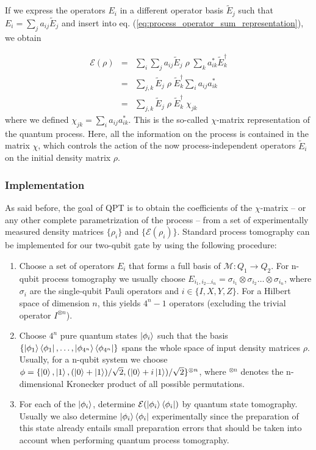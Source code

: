 \smallskip

If we express the operators $E_i$ in a different operator basis $\tilde{E}_j$ such that $E_i = \sum_j a_{ij} \tilde{E}_{j}$ and insert into eq. (\ref{eq:process_operator_sum_representation}), we obtain

\begin{eqnarray}
 \mathcal{E}(\rho) & = & \sum\limits_i \sum\limits_j a_{ij} \tilde{E}_j \;\rho\; \sum\limits_k a_{ik}^* \tilde{E}_k^\dagger \\
& = & \sum\limits_{j,k}\tilde{E}_j \; \rho \; \tilde{E}_k^\dagger \sum\limits_i a_{ij} a_{ik}^* \\
& = & \sum\limits_{j,k}\tilde{E}_j \; \rho \; \tilde{E}_k^\dagger \; \chi_{jk} \label{eq:process_chi_representation}
\end{eqnarray}
where we defined $\chi_{jk} = \sum\limits_i a_{ij} a_{ik}^*$. This is the so-called $\chi$-matrix representation of the quantum process. Here, all the information on the process is contained in the matrix $\chi$, which controls the action of the now process-independent operators $\tilde{E}_i$ on the initial density matrix $\rho$.

\subsubsection{Implementation}

As said before, the goal of QPT is to obtain the coefficients of the $\chi$-matrix -- or any other complete parametrization of the process -- from a set of experimentally measured density matrices $\{\rho_i\}$ and $\{\mathcal{E}(\rho_i)\}$. Standard process tomography \citep{nielsen_quantum_2000,poyatos_complete_1997} can be implemented for our two-qubit gate by using the following procedure:

\begin{enumerate}
\item Choose a set of operators $E_i$ that forms a full basis of $\mathcal{M}: Q_1 \to Q_2$. For n-qubit process tomography we usually choose $E_{i_1,i_2 \hdots i_n} = \sigma_{i_1}\otimes \sigma_{i_2}\hdots\otimes\sigma_{i_n}$, where $\sigma_i$ are the single-qubit Pauli operators and $i\in\{I,X,Y,Z\}$. For a Hilbert space of dimension $n$, this yields $4^n-1$ operators (excluding the trivial operator $I^{\otimes n}$).
\item Choose $4^n$ pure quantum states $\left| \phi_i \right>$ such that the basis $\{\left| \phi_1 \right>\left< \phi_1 \right|,\hdots,\left| \phi_{4^n} \right>\left< \phi_{4^n} \right|\}$ spans the whole space of input density matrices $\rho$. Usually, for a n-qubit system we choose $\phi = \{\left| 0 \right>,\left| 1 \right>,(\left| 0 \right>+\left| 1 \right>)/\sqrt{2},(\left| 0 \right>+i\left| 1 \right>)/\sqrt{2}\}^{\otimes n}$, where $^{\otimes n}$ denotes the n-dimensional Kronecker product of all possible permutations.
\item For each of the $\left| \phi_i \right>$, determine $\mathcal{E}(\left| \phi_i \right>\left< \phi_i \right|)$ by quantum state tomography. Usually we also determine $\left| \phi_i \right>\left< \phi_i \right|$ experimentally since the preparation of this state already entails small preparation errors that should be taken into account when performing quantum process tomography. 
\end{enumerate}

